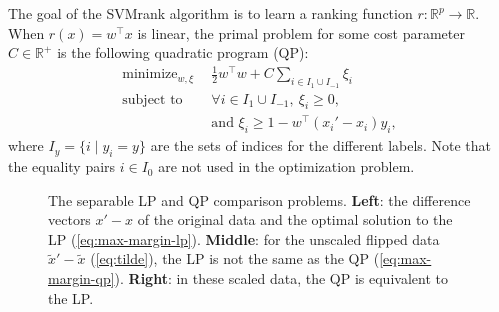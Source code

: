 \documentclass{article}
\newcommand{\RR}{\mathbb R}
\DeclareMathOperator*{\minimize}{minimize}
\begin{document}
The goal of the SVMrank algorithm is to learn a ranking function
$r:\RR^p \rightarrow \RR$. When $r(x)=w^\intercal x$ is linear, the
primal problem for some cost parameter $C\in\RR^+$ is the following
quadratic program (QP):
\begin{equation}
  \begin{aligned}
    \minimize_{w, \xi}\ \  & \frac 1 2 w^\intercal w 
    + C \sum_{i\in I_1\cup I_{-1}} \xi_i \\
    \text{subject to}\ \  & 
    \forall i\in I_1\cup I_{-1},\ \xi_i \geq 0,\\
&    \text{and }\xi_i \geq 1-w^\intercal(x_i'-x_i)y_i,
  \end{aligned}
  \label{eq:svmrank}
\end{equation}
where $I_y=\{i\mid y_i=y\}$ are the sets of indices for the different
labels. Note that the equality pairs $i\in I_0$ are not
used in the optimization problem.

\begin{figure*}[b!]
  \centering
  
  \vskip -1cm
  \caption{The separable LP and QP comparison problems. \textbf{Left}:
    the difference vectors $x'-x$ of the original data and the optimal
    solution to the LP (\ref{eq:max-margin-lp}). \textbf{Middle}: for
    the unscaled flipped data $\tilde x'-\tilde x$ (\ref{eq:tilde}),
    the LP is not the same as the QP
    (\ref{eq:max-margin-qp}). \textbf{Right}: in these scaled
    data, the QP is equivalent to the LP.}
  \label{fig:hard-margin}
\end{figure*}
\end{document}
